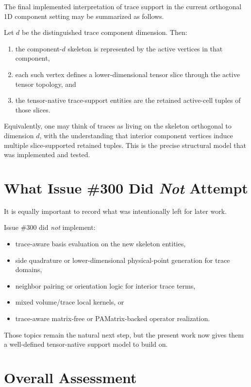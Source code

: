 \documentclass[11pt]{article}
\begin{document}
The final implemented interpretation of trace support in the current orthogonal 1D component setting may be summarized as follows.

Let $d$ be the distinguished trace component dimension. Then:
\begin{enumerate}[leftmargin=2em]
  \item the component-$d$ skeleton is represented by the active vertices in that component,
  \item each such vertex defines a lower-dimensional tensor slice through the active tensor topology, and
  \item the tensor-native trace-support entities are the retained active-cell tuples of those slices.
\end{enumerate}

Equivalently, one may think of traces as living on the skeleton orthogonal to dimension $d$, with the understanding that interior component vertices induce multiple slice-supported retained tuples. This is the precise structural model that was implemented and tested.

\section{What Issue \#300 Did \emph{Not} Attempt}

It is equally important to record what was intentionally left for later work.

Issue \#300 did \emph{not} implement:
\begin{itemize}[leftmargin=2em]
  \item trace-aware basis evaluation on the new skeleton entities,
  \item side quadrature or lower-dimensional physical-point generation for trace domains,
  \item neighbor pairing or orientation logic for interior trace terms,
  \item mixed volume/trace local kernels, or
  \item trace-aware matrix-free or PAMatrix-backed operator realization.
\end{itemize}

Those topics remain the natural next step, but the present work now gives them a well-defined tensor-native support model to build on.

\section{Overall Assessment}
\end{document}
